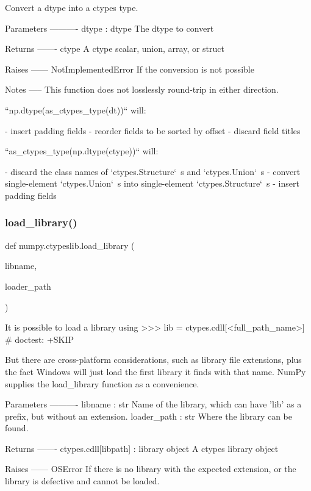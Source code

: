 \begin{DoxyVerb}Convert a dtype into a ctypes type.

Parameters
----------
dtype : dtype
    The dtype to convert

Returns
-------
ctype
    A ctype scalar, union, array, or struct

Raises
------
NotImplementedError
    If the conversion is not possible

Notes
-----
This function does not losslessly round-trip in either direction.

``np.dtype(as_ctypes_type(dt))`` will:

 - insert padding fields
 - reorder fields to be sorted by offset
 - discard field titles

``as_ctypes_type(np.dtype(ctype))`` will:

 - discard the class names of `ctypes.Structure`\ s and
   `ctypes.Union`\ s
 - convert single-element `ctypes.Union`\ s into single-element
   `ctypes.Structure`\ s
 - insert padding fields\end{DoxyVerb}
 \mbox{\label{namespacenumpy_1_1ctypeslib_a001f7f1a75e034d49fe3be3c8350b7a2}} 
\subsubsection{\texorpdfstring{load\+\_\+library()}{load\_library()}}
{\footnotesize\ttfamily def numpy.\+ctypeslib.\+load\+\_\+library (\begin{DoxyParamCaption}\item[{}]{libname,  }\item[{}]{loader\+\_\+path }\end{DoxyParamCaption})}

\begin{DoxyVerb}It is possible to load a library using
>>> lib = ctypes.cdll[<full_path_name>] # doctest: +SKIP

But there are cross-platform considerations, such as library file extensions,
plus the fact Windows will just load the first library it finds with that name.
NumPy supplies the load_library function as a convenience.

Parameters
----------
libname : str
    Name of the library, which can have 'lib' as a prefix,
    but without an extension.
loader_path : str
    Where the library can be found.

Returns
-------
ctypes.cdll[libpath] : library object
   A ctypes library object

Raises
------
OSError
    If there is no library with the expected extension, or the
    library is defective and cannot be loaded.
\end{DoxyVerb}
 \mbox{\label{namespacenumpy_1_1ctypeslib_aa73ff2a745cc30ff0987c2abfe42c083}} 
